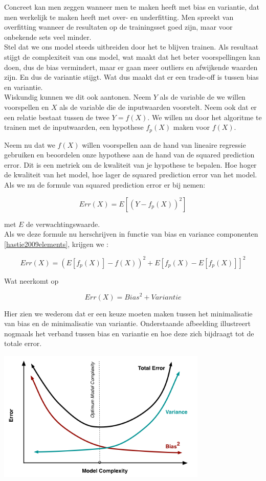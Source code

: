 \begin{itemize}
Concreet kan men zeggen wanneer men te maken heeft met bias en variantie, dat men werkelijk te maken heeft met over- en underfitting. Men spreekt van overfitting wanneer de resultaten op de trainingsset goed zijn, maar voor onbekende sets veel minder.\\
Stel dat we ons model steeds uitbreiden door het te blijven trainen. Als resultaat stijgt de complexiteit van ons model, wat maakt dat het beter voorspellingen kan doen, dus de bias vermindert, maar er gaan meer outliers en afwijkende waarden zijn. En dus de variantie stijgt. Wat dus maakt dat er een trade-off is tussen bias en variantie.\\ 
%
Wiskundig kunnen we dit ook aantonen. Neem $Y$ als de variable de we willen voorspellen en $X$ als de variable die de inputwaarden voorstelt. Neem ook dat er een relatie bestaat tussen de twee $Y=f(X)$. We willen nu door het algoritme te trainen met de inputwaarden, een hypothese $f_{p}(X)$ maken voor $f(X)$. 

Neem nu dat we $f(X)$ willen voorspellen aan de hand van lineaire regressie gebruiken en beoordelen onze hypothese aan de hand van de squared prediction error. Dit is een metriek om de kwaliteit van je hypothese te bepalen. Hoe hoger de kwaliteit van het model, hoe lager de squared prediction error van het model. Als we nu de formule van squared prediction error er bij nemen:

\[ Err(X)=E[(Y − f_{p}(X))^2] \]

met $E$ de verwachtingswaarde.\\
%
Als we deze formule nu herschrijven in functie van bias en variance componenten \ref{hastie2009elements}, krijgen we :

\[ Err(X)=(E[f_{p}(X)] − f(X))^2+E[f_{p}(X) - E[f_{p}(X)]]^2 \]

Wat neerkomt op 

\[Err(X)= Bias^2 + Variantie \]

Hier zien we wederom dat er een keuze moeten maken tussen het minimalisatie van bias en de minimalisatie van variantie.
Onderstaande afbeelding illustreert nogmaals het verband tussen bias en variantie en hoe deze zich bijdraagt tot de totale error.
\begin{center}
  \includegraphics[width=10cm]{biasvariance_tradeoff}
  \label{fig:biasvariance}
\end{center}


\end{itemize}
